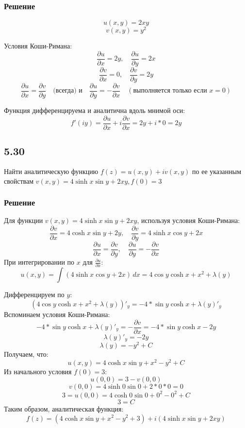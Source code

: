 \documentclass[12pt,a4paper]{article}
\begin{document}
\subsubsection*{Решение}
\[
  u(x, y) = 2xy
 \]
 \[
v(x, y) = y^2
 \]

Условия Коши-Римана:
\[
\frac{\partial u}{\partial x} = 2y, \quad \frac{\partial u}{\partial y} = 2x
\]
\[
\frac{\partial v}{\partial x} = 0, \quad \frac{\partial v}{\partial y} = 2y
\]
\[
\]
\[
\frac{\partial u}{\partial x} = \frac{\partial v}{\partial y} \quad \text{(всегда) и} \quad \frac{\partial u}{\partial y} = -\frac{\partial v}{\partial x} \quad (\text{выполняется только если } x = 0)
\]

Функция дифференцируема и аналитична вдоль мнимой оси:
\[
f'(iy) = \frac{\partial u}{\partial x}+i\frac{\partial v}{\partial x}=2y+i*0=2y
\]
\subsection*{5.30}
Найти аналитическую функцию $f(z)=u(x,y)+iv(x,y)$ по ее указанным свойствам 
$v(x,y)=4\sinh{x}\sin{y}+2xy, f(0)=3$
\subsubsection*{Решение}
Для функции \( v(x, y) = 4\sinh x \sin y + 2xy \), используя условия Коши-Римана:
\[
\frac{\partial v}{\partial x} = 4\cosh x \sin y + 2y, \quad \frac{\partial v}{\partial y} = 4\sinh x \cos y + 2x
\]
\[
\frac{\partial u}{\partial x} = \frac{\partial v}{\partial y}, \quad \frac{\partial u}{\partial y} = -\frac{\partial v}{\partial x}
\]
При интегрировании по \( x \) для \( \frac{\partial u}{\partial x} \):
\[
u(x, y) = \int (4 \sinh x \cos y + 2x) \, dx = 4 \cos y \cosh x + x^2 + \lambda(y)
\]

Дифференцируем по \( y \):
\[
(4 \cos y \cosh x + x^2 + \lambda(y))'_{y}=-4*\sin{y}\cosh{x}+\lambda(y)'_{y}
\]
Вспоминаем условия Коши-Римана:
\[
-4*\sin{y}\cosh{x}+\lambda(y)'_{y}=-\frac{\partial v}{\partial x}=-4*\sin{y}\cosh{x}-2y
\]
\[
\lambda(y)'_{y}=-2y
\]
\[
\lambda(y)=-y^2+C
\]
Получаем, что:
\[
u(x, y) = 4\cosh x \sin y + x^2 - y^2 + C
\]
Из начального условия \( f(0) = 3 \):
\[
u(0, 0) = 3 -v(0,0)
\]
\[
v(0, 0) = 4\sinh 0 \sin 0 + 2*0*0=0 
\]
\[
3=u(0, 0) = 4\cosh 0 \sin 0 + 0^2 - 0^2 + C
\]
\[
3=C
\]
Таким образом, аналитическая функция:
\[
f(z) = (4\cosh x \sin y + x^2 - y^2 + 3) + i(4\sinh x \sin y + 2xy)
\]
\end{document}
